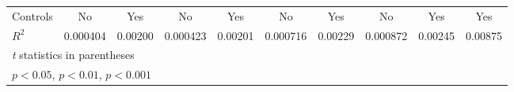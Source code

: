 {\begin{tabular}{l*{9}{c}}
Controls        &       No         &      Yes         &       No         &      Yes         &       No         &      Yes         &       No         &      Yes         &      Yes         \\
$ R^2 $         & 0.000404         &  0.00200         & 0.000423         &  0.00201         & 0.000716         &  0.00229         & 0.000872         &  0.00245         &  0.00875         \\
\hline\hline
\multicolumn{10}{l}{\footnotesize \textit{t} statistics in parentheses}\\
\multicolumn{10}{l}{\footnotesize \sym{*} \(p<0.05\), \sym{**} \(p<0.01\), \sym{***} \(p<0.001\)}\\
\end{tabular}
}
